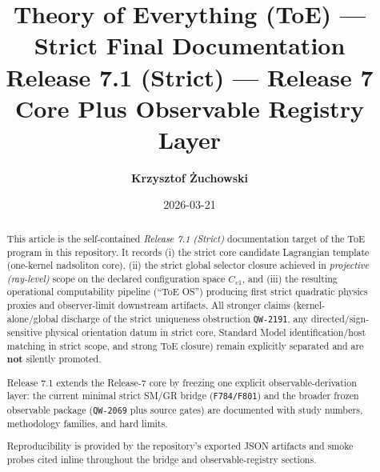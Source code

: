 \documentclass[11pt,a4paper]{article}
\title{\textbf{Theory of Everything (ToE) --- Strict Final Documentation}\\
\large Release 7.1 (Strict) --- Release 7 Core Plus Observable Registry Layer}
\author{\textbf{Krzysztof Żuchowski}}
\date{2026-03-21}
\begin{document}
\maketitle

\begin{abstract}
This article is the self-contained \emph{Release 7.1 (Strict)} documentation target of the ToE program in this repository.
It records (i) the strict core candidate Lagrangian template (one-kernel nadsoliton core), (ii) the strict global selector
closure achieved in \emph{projective (ray-level)} scope on the declared configuration space $C_{v1}$, and (iii) the resulting
operational computability pipeline (“ToE OS”) producing first strict quadratic physics proxies and observer-limit downstream artifacts.
All stronger claims (kernel-alone/global discharge of the strict uniqueness obstruction \texttt{QW-2191}, any directed/sign-sensitive
physical orientation datum in strict core, Standard Model identification/host matching in strict scope, and strong ToE closure)
remain explicitly separated and are \textbf{not} silently promoted.

Release 7.1 extends the Release-7 core by freezing one explicit observable-derivation layer: the current minimal strict SM/GR bridge
(\texttt{F784/F801}) and the broader frozen observable package (\texttt{QW-2069} plus source gates) are documented with study numbers,
methodology families, and hard limits.

Reproducibility is provided by the repository's exported JSON artifacts and smoke probes cited inline throughout the bridge and
observable-registry sections.
\end{abstract}
\end{document}
